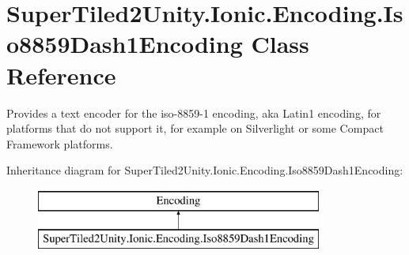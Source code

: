 \hypertarget{class_super_tiled2_unity_1_1_ionic_1_1_encoding_1_1_iso8859_dash1_encoding}{}\section{Super\+Tiled2\+Unity.\+Ionic.\+Encoding.\+Iso8859\+Dash1\+Encoding Class Reference}
\label{class_super_tiled2_unity_1_1_ionic_1_1_encoding_1_1_iso8859_dash1_encoding}


Provides a text encoder for the iso-\/8859-\/1 encoding, aka Latin1 encoding, for platforms that do not support it, for example on Silverlight or some Compact Framework platforms.  


Inheritance diagram for Super\+Tiled2\+Unity.\+Ionic.\+Encoding.\+Iso8859\+Dash1\+Encoding\+:\begin{figure}[H]
\begin{center}
\leavevmode
\includegraphics[height=2.000000cm]{class_super_tiled2_unity_1_1_ionic_1_1_encoding_1_1_iso8859_dash1_encoding}
\end{center}
\end{figure}
